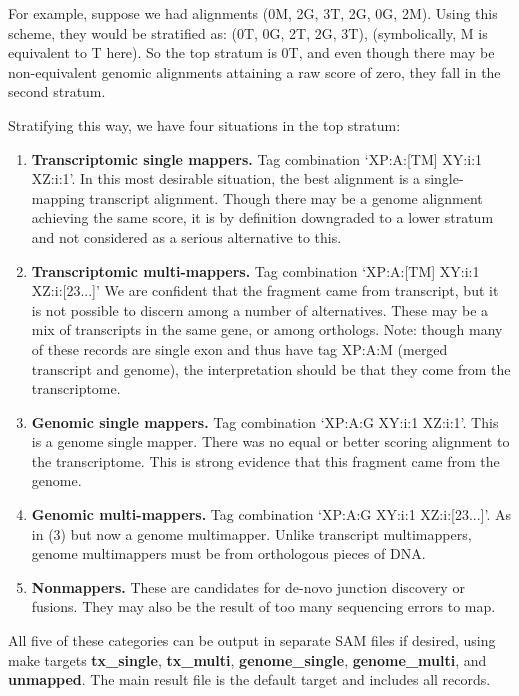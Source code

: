 \documentclass[10pt]{article}
\begin{document}
For example, suppose we had alignments (0M, 2G, 3T, 2G, 0G, 2M). Using
this scheme, they would be stratified as: (0T, 0G, 2T, 2G, 3T),
(symbolically, M is equivalent to T here). So the top stratum is 0T,
and even though there may be non-equivalent genomic alignments
attaining a raw score of zero, they fall in the second stratum.

Stratifying this way, we have four situations in the top stratum:

\begin{enumerate}

\item \textbf{Transcriptomic single mappers.} Tag combination `XP:A:[TM]
  XY:i:1 XZ:i:1'. In this most desirable situation, the best alignment
  is a single-mapping transcript alignment. Though there may be a
  genome alignment achieving the same score, it is by definition
  downgraded to a lower stratum and not considered as a serious
  alternative to this.

\item \textbf{Transcriptomic multi-mappers.}  Tag combination
  `XP:A:[TM] XY:i:1 XZ:i:[23...]' We are confident that the fragment
  came from transcript, but it is not possible to discern among a
  number of alternatives. These may be a mix of transcripts in the
  same gene, or among orthologs. Note: though many of these records
  are single exon and thus have tag XP:A:M (merged transcript and
  genome), the interpretation should be that they come from the
  transcriptome.

\item \textbf{Genomic single mappers.} Tag
  combination `XP:A:G XY:i:1 XZ:i:1'. This is a genome single
  mapper. There was no equal or better scoring alignment to the
  transcriptome. This is strong evidence that this fragment came from
  the genome.

\item \textbf{Genomic multi-mappers.} Tag
  combination `XP:A:G XY:i:1 XZ:i:[23...]'. As in (3) but now a genome
  multimapper. Unlike transcript multimappers, genome multimappers
  must be from orthologous pieces of DNA.

\item \textbf{Nonmappers.} These are candidates for
  de-novo junction discovery or fusions. They may also be the result
  of too many sequencing errors to map.

\end{enumerate}

All five of these categories can be output in separate SAM files if
desired, using make targets \textbf{tx\_single}, \textbf{tx\_multi},
\textbf{genome\_single}, \textbf{genome\_multi}, and
\textbf{unmapped}. The main result file is the default target and
includes all records.
\end{document}
